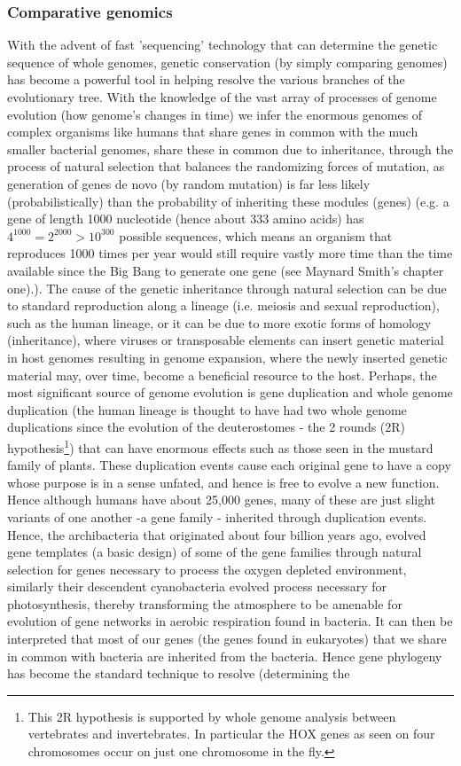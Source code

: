 \subsubsection{Comparative genomics}
With the advent of fast 'sequencing' technology that can determine the genetic sequence of whole genomes, genetic conservation (by simply comparing genomes) has become a powerful tool in helping resolve the various branches of the evolutionary tree.  With the knowledge of the vast array of processes of genome evolution (how genome's changes in time) we infer the enormous genomes of complex organisms like humans that share genes in common with the much smaller bacterial genomes, share these in common due to inheritance, through the process of natural selection that balances the randomizing forces of mutation, as generation of genes de novo (by random mutation) is far less likely (probabilistically) than the probability of inheriting these modules (genes) (e.g. a gene of length 1000 nucleotide (hence about 333 amino acids) has $4^{1000}=2^{2000} > 10^{300}$ possible sequences, which means an organism that reproduces 1000 times per year would still require vastly more time than the time available since the Big Bang to generate one gene (see Maynard Smith's chapter one\cite{maynard}).).  The cause of the genetic inheritance through natural selection can be due to standard reproduction along a lineage (i.e. meiosis and sexual reproduction), such as the human lineage, or it can be due to more exotic forms of homology (inheritance), where viruses or transposable elements can insert genetic material in host genomes resulting in genome expansion, where the newly inserted genetic material may, over time, become a beneficial resource to the host.  Perhaps, the most significant source of genome evolution is gene duplication and whole genome duplication (the human lineage is thought to have had two whole genome duplications since the evolution of the deuterostomes - the 2 rounds (2R) hypothesis\footnote{This 2R hypothesis is supported by whole genome analysis between vertebrates and invertebrates.  In particular the HOX genes as seen on four chromosomes occur on just one chromosome in the fly.}) that can have enormous effects such as those seen in the mustard family of plants.  These duplication events cause each original gene to have a copy whose purpose is in a sense unfated, and hence is free to evolve a new function.  Hence although humans have about 25,000 genes, many of these are just slight variants of one another -a gene family - inherited through duplication events.  Hence, the archibacteria that originated about four billion years ago, evolved gene templates (a basic design) of some of the gene families through natural selection for genes necessary to process the oxygen depleted environment, similarly their descendent cyanobacteria evolved process necessary for photosynthesis, thereby transforming the atmosphere to be amenable for evolution of gene networks in aerobic respiration found in bacteria.  It can then be interpreted that most of our genes (the genes found in eukaryotes) that we share in common with bacteria are inherited from the bacteria.  Hence gene phylogeny has become the standard technique to resolve (determining the 